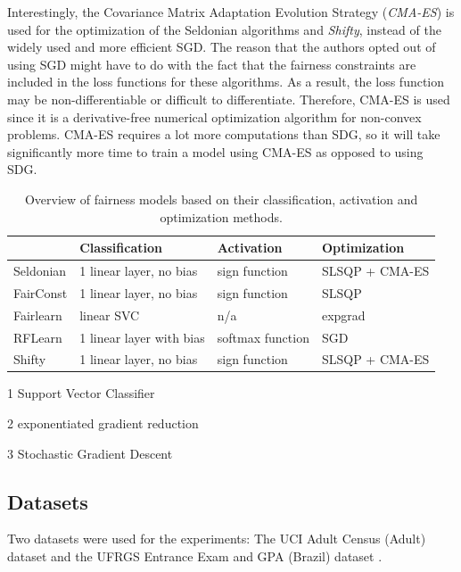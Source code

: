 Interestingly, the Covariance Matrix Adaptation Evolution Strategy (\textit{CMA-ES}) is used for the optimization of the Seldonian algorithms and \textit{Shifty}, instead of the widely used and more efficient SGD. The reason that the authors opted out of using SGD might have to do with the fact that the fairness constraints are included in the loss functions for these algorithms. As a result, the loss function may be non-differentiable or difficult to differentiate. Therefore, CMA-ES is used since it is a derivative-free numerical optimization algorithm for non-convex problems. CMA-ES requires a lot more computations than SDG, so it will take significantly more time to train a model using CMA-ES as opposed to using SDG.

\begin{table}[H]
\centering
\begin{threeparttable}
\begin{tabular}{llll}
\toprule
{} &  Classification & Activation & Optimization \\
\midrule
Seldonian   & 1 linear layer, no bias  & sign function    & SLSQP + CMA-ES \\
FairConst   & 1 linear layer, no bias  & sign function    & SLSQP \\
Fairlearn   & linear SVC\tnote{1}      & n/a              & expgrad\tnote{2} \\
RFLearn     & 1 linear layer with bias & softmax function & SGD\tnote{3} \\
Shifty      & 1 linear layer, no bias  & sign function    & SLSQP + CMA-ES \\
\bottomrule
\end{tabular}

    \begin{tablenotes}
        \item[1] Support Vector Classifier
        \item[2] exponentiated gradient reduction
        \item[3] Stochastic Gradient Descent
    \end{tablenotes}

\end{threeparttable}
\caption{Overview of fairness models based on their classification, activation and optimization methods.}
\label{table:models-compared}
\end{table}


\subsection{Datasets}
\label{sec:datasets}
Two datasets were used for the experiments: The UCI Adult Census (Adult) dataset \cite{kohavi1996uci} and the UFRGS Entrance Exam and GPA (Brazil) dataset \cite{da2019ufrgs}. \\

